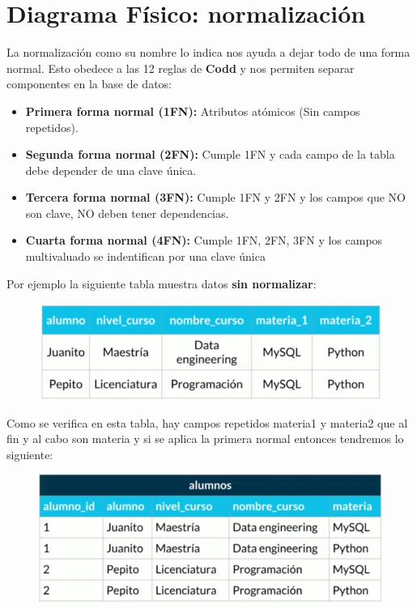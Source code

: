 \documentclass{article}
\begin{document}
\section{Diagrama Físico: normalización}%
La normalización como su nombre lo indica nos ayuda a dejar todo de una forma
normal. Esto obedece a las 12 reglas de \textbf{Codd} y nos permiten separar
componentes en la base de datos:\\

\begin{itemize}
  \item \textbf{Primera forma normal (1FN):} Atributos atómicos (Sin campos repetidos).
  \item \textbf{Segunda forma normal (2FN):} Cumple 1FN y cada campo de la
    tabla debe depender de una clave única.
  \item \textbf{Tercera forma normal (3FN):} Cumple 1FN y 2FN y los campos que
    NO son clave, NO deben tener dependencias.
  \item \textbf{Cuarta forma normal (4FN):} Cumple 1FN, 2FN, 3FN y los campos
    multivaluado se indentifican por una clave única
\end{itemize}

Por ejemplo la siguiente tabla muestra datos \textbf{sin normalizar}:

\begin{figure}[h!]
    \centering
      \includegraphics[scale=0.45]{./Pictures/022_sin_normalizar.png}
\end{figure}

Como se verifica en esta tabla, hay campos repetidos materia1 y materia2 que al
fin y al cabo son materia y si se aplica la primera normal entonces tendremos
lo siguiente:

\newpage

\begin{figure}[h!]
    \centering
      \includegraphics[scale=0.45]{./Pictures/023_primera_normal.png}
\end{figure}
\end{document}
